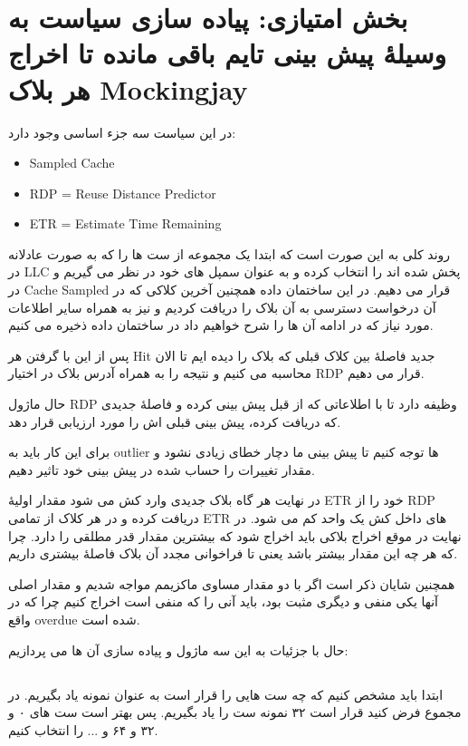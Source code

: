 \documentclass[17pt]{article}
\begin{document}
\section{بخش امتیازی: پیاده سازی سیاست به وسیلهٔ پیش بینی تایم باقی مانده تا اخراج هر بلاک Mockingjay}

در این سیاست سه جزء اساسی وجود دارد: 
\begin{latin}
\begin{itemize}
	\item Sampled Cache
	\item RDP = Reuse Distance Predictor
	\item ETR = Estimate Time Remaining
\end{itemize}	
\end{latin}

روند کلی به این صورت است که ابتدا یک مجموعه از ست ها را که به صورت عادلانه در LLC پخش شده اند را انتخاب کرده و به عنوان سمپل های خود در نظر می گیریم و در Cache Sampled قرار می دهیم. در این ساختمان داده همچنین آخرین کلاکی که در آن درخواست دسترسی به آن بلاک را دریافت کردیم و نیز به همراه سایر اطلاعات مورد نیاز که در ادامه آن ها را شرح خواهیم داد در ساختمان داده ذخیره می کنیم.

پس از این با گرفتن هر Hit جدید فاصلهٔ بین کلاک قبلی که بلاک را دیده ایم تا الان محاسبه می کنیم و نتیجه را به همراه آدرس بلاک در اختیار RDP قرار می دهیم.

حال ماژول RDP وظیفه دارد تا با اطلاعاتی که از قبل پیش بینی کرده و فاصلهٔ جدیدی که دریافت کرده، پیش بینی قبلی اش را مورد ارزیابی قرار دهد.

برای این کار باید به outlier ها توجه کنیم تا پیش بینی ما دچار خطای زیادی نشود و مقدار تغییرات را حساب شده در پیش بینی خود تاثیر دهیم.

در نهایت هر گاه بلاک جدیدی وارد کش می شود مقدار اولیهٔ ETR خود را از RDP دریافت کرده و در هر کلاک از تمامی ETR های داخل کش یک واحد کم می شود. در نهایت در موقع اخراج بلاکی باید اخراج شود که بیشترین مقدار قدر مطلقی را دارد. چرا که هر چه این مقدار بیشتر باشد یعنی تا فراخوانی مجدد آن بلاک فاصلهٔ بیشتری داریم.

همچنین شایان ذکر است اگر با دو مقدار مساوی ماکزیمم مواجه شدیم و مقدار اصلی آنها یکی منفی و دیگری مثبت بود، باید آنی را که منفی است اخراج کنیم چرا که در واقع overdue شده است.

حال با جزئیات به این سه ماژول و پیاده سازی آن ها می پردازیم:

\subsection{}
ابتدا باید مشخص کنیم که چه ست هایی را قرار است به عنوان نمونه یاد بگیریم. در مجموع فرض کنید قرار است ۳۲ نمونه ست را یاد بگیریم.
پس بهتر است ست های ۰ و ۳۲ و ۶۴ و ... را انتخاب کنیم.
\end{document}
